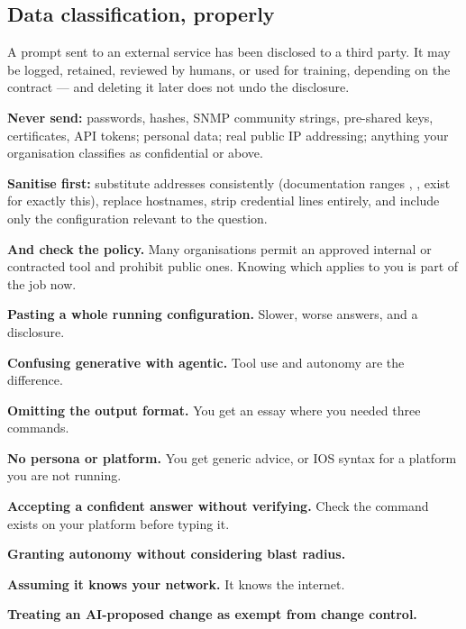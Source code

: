 \subsection{Data classification, properly}\label{sec:dataclass}

\begin{alertbox}
A prompt sent to an external service has been disclosed to a third party. It may
be logged, retained, reviewed by humans, or used for training, depending on the
contract --- and deleting it later does not undo the disclosure.

\textbf{Never send:} passwords, hashes, SNMP community strings, pre-shared keys,
certificates, API tokens; personal data; real public IP addressing; anything
your organisation classifies as confidential or above.

\textbf{Sanitise first:} substitute addresses consistently (documentation ranges
, ,  exist for exactly
this), replace hostnames, strip credential lines entirely, and include only the
configuration relevant to the question.

\textbf{And check the policy.} Many organisations permit an approved internal or
contracted tool and prohibit public ones. Knowing which applies to you is part
of the job now.
\end{alertbox}

\begin{pitfall}
\begin{tight}
  \item \textbf{Pasting a whole running configuration.} Slower, worse answers,
        and a disclosure.
  \item \textbf{Confusing generative with agentic.} Tool use and autonomy are the
        difference.
  \item \textbf{Omitting the output format.} You get an essay where you needed
        three commands.
  \item \textbf{No persona or platform.} You get generic advice, or IOS syntax
        for a platform you are not running.
  \item \textbf{Accepting a confident answer without verifying.} Check the
        command exists on your platform before typing it.
  \item \textbf{Granting autonomy without considering blast radius.}
  \item \textbf{Assuming it knows your network.} It knows the internet.
  \item \textbf{Treating an AI-proposed change as exempt from change control.}
\end{tight}
\end{pitfall}

